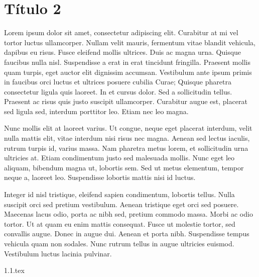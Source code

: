 \chapter{Título 2}
Lorem ipsum dolor sit amet, consectetur adipiscing elit. Curabitur at mi vel tortor luctus ullamcorper. Nullam velit mauris, fermentum vitae blandit vehicula, dapibus eu risus. Fusce eleifend mollis ultrices. Duis ac magna urna. Quisque faucibus nulla nisl. Suspendisse a erat in erat tincidunt fringilla. Praesent mollis quam turpis, eget auctor elit dignissim accumsan. Vestibulum ante ipsum primis in faucibus orci luctus et ultrices posuere cubilia Curae; Quisque pharetra consectetur ligula quis laoreet. In et cursus dolor. Sed a sollicitudin tellus. Praesent ac risus quis justo suscipit ullamcorper. Curabitur augue est, placerat sed ligula sed, interdum porttitor leo. Etiam nec leo magna.

Nunc mollis elit at laoreet varius. Ut congue, neque eget placerat interdum, velit nulla mattis elit, vitae interdum nisi risus nec magna. Aenean sed lectus iaculis, rutrum turpis id, varius massa. Nam pharetra metus lorem, et sollicitudin urna ultricies at. Etiam condimentum justo sed malesuada mollis. Nunc eget leo aliquam, bibendum magna ut, lobortis sem. Sed ut metus elementum, tempor neque a, laoreet leo. Suspendisse lobortis mattis nisi id luctus.

Integer id nisl tristique, eleifend sapien condimentum, lobortis tellus. Nulla suscipit orci sed pretium vestibulum. Aenean tristique eget orci sed posuere. Maecenas lacus odio, porta ac nibh sed, pretium commodo massa. Morbi ac odio tortor. Ut at quam eu enim mattis consequat. Fusce ut molestie tortor, sed convallis augue. Donec in augue dui. Aenean et porta nibh. Suspendisse tempus vehicula quam non sodales. Nunc rutrum tellus in augue ultricies euismod. Vestibulum luctus lacinia pulvinar.

{1.1.tex}